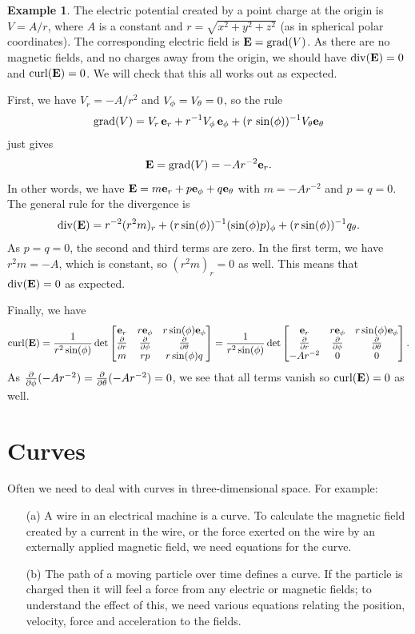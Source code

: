 \documentclass[reqno]{amsart}
\theoremstyle{definition}
\newtheorem{example}[theorem]{Example}
\begin{document}
\begin{example}
 The electric potential created by a point charge at the origin is
 $V=A/r$, where $A$ is a constant and $r=\sqrt{x^2+y^2+z^2}$ (as in
 spherical polar coordinates).  The corresponding electric field is
 $\mathbf{E}=\operatorname{grad}(V)$.  As there are no magnetic fields, and no charges away
 from the origin, we should have $\operatorname{div}(\mathbf{E})=0$ and $\operatorname{curl}(\mathbf{E})=0$.  We
 will check that this all works out as expected.

 First, we have $V_r=-A/r^2$ and $V_\phi=V_\theta=0$, so the rule
 \[ \operatorname{grad}(V) = V_r\,\mathbf{e}_r + r^{-1}V_\phi\,\mathbf{e}_\phi +
                (r\,\sin(\phi))^{-1}V_\theta\mathbf{e}_\theta
 \]
 just gives 
 \[ \mathbf{E} = \operatorname{grad}(V) = -Ar^{-2}\mathbf{e}_r. \]
 In other words, we have $\mathbf{E}=m\mathbf{e}_r+p\mathbf{e}_\phi+q\mathbf{e}_\theta$ with
 $m=-Ar^{-2}$ and $p=q=0$.  The general rule for the divergence is
 \[ \operatorname{div}(\mathbf{E})
     = r^{-2}(r^2m)_r + (r\sin(\phi))^{-1}(\sin(\phi)p)_\phi + 
         (r\sin(\phi))^{-1}q_\theta.
 \]
 As $p=q=0$, the second and third terms are zero.  In the first term,
 we have $r^2m=-A$, which is constant, so $(r^2m)_r=0$ as well.  This
 means that $\operatorname{div}(\mathbf{E})=0$ as expected.

 Finally, we have 
 \[ \operatorname{curl}(\mathbf{E})
      = \frac{1}{r^2\sin(\phi)} \det\left[\begin{matrix}
          \mathbf{e}_r & r\mathbf{e}_\phi & r\sin(\phi)\mathbf{e}_\phi \\
          \frac{\partial}{\partial r}  & \frac{\partial}{\partial\phi}      & \frac{\partial}{\partial\theta}  \\
          m     & rp        & r\sin(\phi)q \end{matrix}\right] 
      = \frac{1}{r^2\sin(\phi)} \det\left[\begin{matrix}
          \mathbf{e}_r & r\mathbf{e}_\phi & r\sin(\phi)\mathbf{e}_\phi \\
          \frac{\partial}{\partial r}  & \frac{\partial}{\partial\phi}      & \frac{\partial}{\partial\theta}  \\
          -Ar^{-2} & 0      & 0 \end{matrix}\right]. 
 \]
 As $\frac{\partial}{\partial\phi}(-Ar^{-2})=\frac{\partial}{\partial\theta}(-Ar^{-2})=0$, we see that all terms vanish so
 $\operatorname{curl}(\mathbf{E})=0$ as well.
\end{example}


\section{Curves}
\label{sec-curves}

Often we need to deal with curves in three-dimensional space.  For
example:
\begin{itemize}
 \item[(a)] A wire in an electrical machine is a curve.  To calculate
  the magnetic field created by a current in the wire, or the force
  exerted on the wire by an externally applied magnetic field, we need
  equations for the curve.
 \item[(b)] The path of a moving particle over time defines a curve.
  If the particle is charged then it will feel a force from any
  electric or magnetic fields; to understand the effect of this, we
  need various equations relating the position, velocity, force and
  acceleration to the fields.
\end{itemize}
\end{document}
